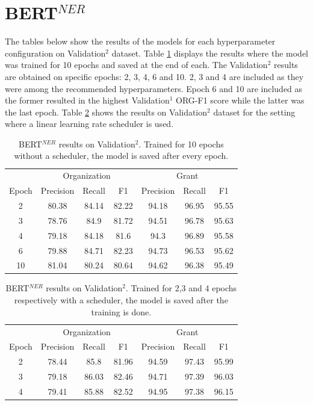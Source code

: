 \documentclass{report}
\theoremstyle{definition}
\theoremstyle{remark}
\begin{document}
\section{BERT$^{NER}$}
\label{sec:app:bertner}
The tables below show the results of the models for each hyperparameter configuration on Validation$^2$ dataset. Table \ref{tab:bert_ner_no_scheduler} displays the results where the model was trained for 10 epochs and saved at the end of each. The Validation$^2$ results are obtained on specific epochs: 2, 3, 4, 6 and 10. 2, 3 and 4 are included as they were among the recommended hyperparameters. Epoch 6 and 10 are included as the former resulted in the highest Validation$^1$ ORG-F1 score while the latter was the last epoch. Table \ref{tab:bert_ner_scheduler} shows the results on Validation$^2$ dataset for the setting where a linear learning rate scheduler is used.

\begin{table}[h!]
    \centering
    \begin{tabular}{c| c c c| c c c}
    &\multicolumn{3}{c|}{Organization}&\multicolumn{3}{c}{Grant} \\
    Epoch&Precision&Recall&F1&Precision&Recall&F1\\
    \hline
    2     & 80.38	&84.14&82.22	&94.18&	96.95&95.55  \\
    3     & 78.76	&84.9&81.72	&94.51&	96.78&95.63  \\
    4     & 79.18	&84.18&81.6	&94.3&	96.89&95.58  \\
    6     & 79.88	&84.71&82.23	&94.73	&96.53&95.62  \\
    10   &  81.04	&80.24&80.64	&94.62&	96.38&95.49  \\
    \end{tabular}
    \caption{BERT$^{NER}$ results on Validation$^2$. Trained for 10 epochs without a scheduler, the model is saved after every epoch.}
    \label{tab:bert_ner_no_scheduler}
\end{table}


\begin{table}[h!]
    \centering
    \begin{tabular}{c| c c c| c c c}
    &\multicolumn{3}{c|}{Organization}&\multicolumn{3}{c}{Grant} \\
    Epoch&Precision&Recall&F1&Precision&Recall&F1\\
    \hline
    2     & 78.44&	85.8&	81.96&	94.59&	97.43&	95.99
 \\
    3     & 79.18&86.03&82.46&94.71&97.39&96.03
 \\
    4     & 79.41&85.88&82.52&94.95&97.38&96.15
 \\
    \end{tabular}
    \caption{BERT$^{NER}$ results on Validation$^2$. Trained for 2,3 and 4 epochs respectively with a scheduler, the model is saved after the training is done.}
    \label{tab:bert_ner_scheduler}
\end{table}
\end{document}
